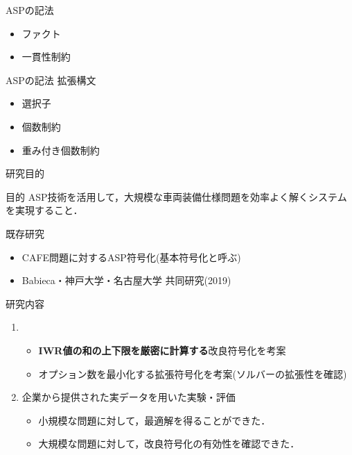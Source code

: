 \documentclass[dvipdfmx, 11pt]{beamer}
\begin{document}
\begin{frame}{ASPの記法}
 \begin{itemize}
  \item ファクト
  \item 一貫性制約
 \end{itemize} 
\end{frame}
\begin{frame}{ASPの記法}
 拡張構文
 \begin{itemize}
  \item 選択子
  \item 個数制約
  \item 重み付き個数制約
 \end{itemize}
\end{frame}
\begin{frame}{研究目的}
 \begin{alertblock}{目的}
  ASP技術を活用して，大規模な車両装備仕様問題を効率よく解くシステム
  を実現すること．
 \end{alertblock}
 \begin{block}{既存研究}
  \begin{itemize}
   \item CAFE問題に対するASP符号化(基本符号化と呼ぶ)
   \item Babieca・神戸大学・名古屋大学 共同研究(2019)
  \end{itemize}
 \end{block}
 \begin{block}{研究内容}
  \begin{enumerate}
   \item {}
	 \begin{itemize}
	  \item \alert{\bf IWR値の和の上下限を厳密に計算する}改良符号化を考案
	  \item オプション数を最小化する拡張符号化を考案(ソルバーの拡張性を確認)
	 \end{itemize}
   \item 企業から提供された実データを用いた実験・評価
	 \begin{itemize}
	  \item 小規模な問題に対して，最適解を得ることができた．
	  \item 大規模な問題に対して，改良符号化の有効性を確認できた．
	 \end{itemize}
  \end{enumerate}
 \end{block}
\end{frame}
\end{document}

